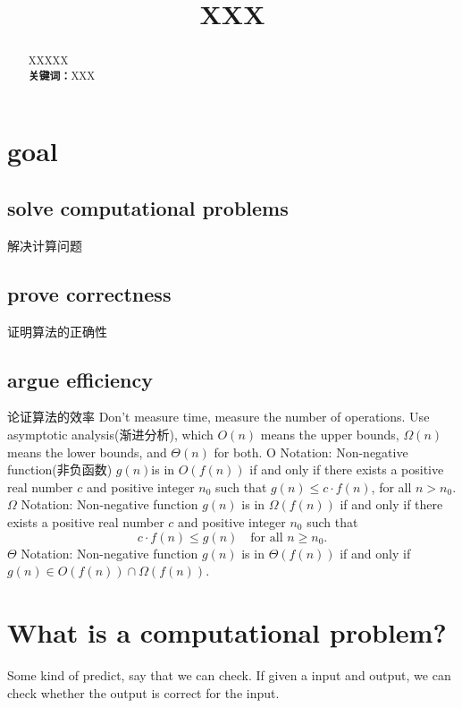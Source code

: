 \documentclass[10.5pt,hyperref,a4paper,UTF8]{ctexart}
\begin{document}
\cover

\begin{abstract}
%
XXXXX\\
\textbf{关键词：}XXX
%
\end{abstract}

\newpage
\tableofcontents
\thispagestyle{empty} %

\newpage
\setcounter{page}{1} %

\begin{center}
    \title{ \Huge \textbf{XXX} }
\end{center}


\thispagestyle{empty} %


\section{goal}
\subsection{solve computational problems}
解决计算问题
\subsection{prove correctness}
证明算法的正确性    
\subsection{argue efficiency}
论证算法的效率
Don't measure time, measure the number of operations.
Use asymptotic analysis(渐进分析), which $O(n)$ means the upper bounds, $\Omega(n)$ means the lower bounds, and $\Theta(n)$ for both.
O Notation: Non-negative function(非负函数) $g(n)$is in $O(f(n))$ if and only if there exists a positive real number $c$ and positive integer $n_0$ such that $g(n) \leq c \cdot f(n)$, for all $n > n_0$.
$\Omega$ Notation: Non-negative function $g(n)$ is in $\Omega(f(n))$ 
if and only if there exists a positive real number $c$ and positive integer $n_0$ 
such that 
\[
c \cdot f(n) \leq g(n) \quad \text{for all } n \geq n_0.
\]
$\Theta$ Notation: Non-negative function $g(n)$ is in $\Theta(f(n))$ if and only if $g(n) \in O(f(n)) \cap \Omega(f(n))$.


\section{What is a computational problem?}
Some kind of predict, say that we can check. If given a input and output, we can check whether the output is correct for the input.
\end{document}
